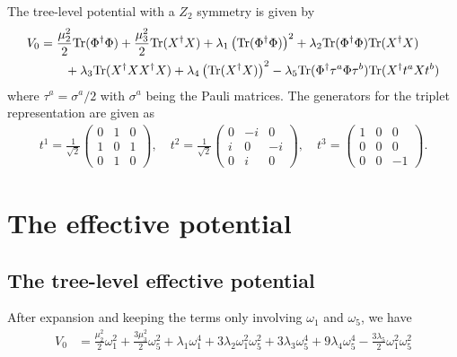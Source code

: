 \documentclass[12pt]{article}
\begin{document}
The tree-level potential with a $Z_2$ symmetry is given by
\begin{align}
    \label{equ:V0}
    V_0 &= \frac{\mu_2^2}{2}{\rm Tr}(\Phi^\dagger\Phi)+\frac{\mu_3^2}{2}{\rm Tr}(X^\dagger X) + \lambda_1\left({\rm Tr}(\Phi^\dagger\Phi)\right)^2 + \lambda_2{\rm Tr}(\Phi^\dagger\Phi){\rm Tr}(X^\dagger X) \nonumber \\
    & \qquad + \lambda_3{\rm Tr}(X^\dagger X X^\dagger X) + \lambda_4\left({\rm Tr}(X^\dagger X)\right)^2 - \lambda_5{\rm Tr}(\Phi^\dagger \tau^a\Phi\tau^b){\rm Tr}(X^\dagger t^a X t^b)
\end{align}
where $\tau^a=\sigma^a/2$ with $\sigma^a$ being the Pauli matrices. The generators for the triplet representation are given as
\begin{align}
    t^1 = \frac{1}{\sqrt{2}}\begin{pmatrix}
        0 & 1 & 0 \\
        1 & 0 & 1 \\
        0 & 1 & 0
    \end{pmatrix}, \quad t^2=\frac{1}{\sqrt{2}}\begin{pmatrix}
        0 & -i & 0 \\
        i & 0 & -i \\
        0 & i & 0
    \end{pmatrix}, \quad t^3=\begin{pmatrix}
        1 & 0 & 0 \\
        0 & 0 & 0 \\
        0 & 0 & -1
    \end{pmatrix}.
\end{align}


\section{The effective potential}

\subsection{The tree-level effective potential}

After expansion and keeping the terms only involving $\omega_1$ and $\omega_5$, we have
\begin{align}
    \label{equ:V0eff}
    V_0 &= \frac{\mu_2^2}{2}\omega_1^2 + \frac{3\mu_3^2}{2}\omega_5^2 + \lambda_1 \omega_1^4 + 3\lambda_2 \omega_1^2 \omega_5^2 +3\lambda_3\omega_5^4 + 9\lambda_4\omega_5^4-\frac{3\lambda_5}{2}\omega_1^2\omega_5^2
\end{align}
\end{document}
